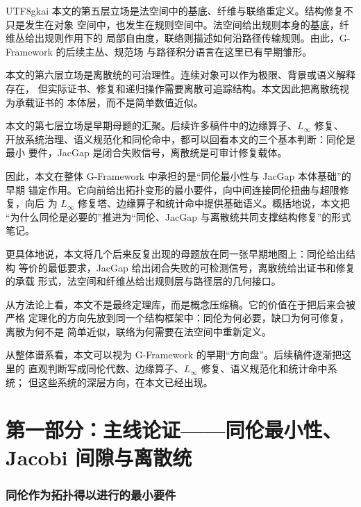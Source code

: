 \documentclass[12pt]{article}
\begin{document}
\begin{CJK*}{UTF8}{gkai}
本文的第五层立场是法空间中的基底、纤维与联络重定义。结构修复不只是发生在对象
空间中，也发生在规则空间中。法空间给出规则本身的基底，纤维丛给出规则作用下的
局部自由度，联络则描述如何沿路径传输规则。由此，G-Framework 的后续主丛、规范场
与路径积分语言在这里已有早期雏形。

本文的第六层立场是离散统的可治理性。连续对象可以作为极限、背景或语义解释存在，
但实际证书、修复和递归操作需要离散可追踪结构。本文因此把离散统视为承载证书的
本体层，而不是简单数值近似。

本文的第七层立场是早期母题的汇聚。后续许多稿件中的边缘算子、\(L_\infty\) 修复、
开放系统治理、语义规范化和同伦命中，都可以回看本文的三个基本判断：同伦是最小
要件，JacGap 是闭合失败信号，离散统是可审计修复载体。

因此，本文在整体 G-Framework 中承担的是“同伦最小性与 JacGap 本体基础”的早期
锚定作用。它向前给出拓扑变形的最小要件，向中间连接同伦扭曲与超限修复，向后
为 \(L_\infty\) 修复塔、边缘算子和统计命中提供基础语义。概括地说，本文把
“为什么同伦是必要的”推进为“同伦、JacGap 与离散统共同支撑结构修复”的形式笔记。

更具体地说，本文将几个后来反复出现的母题放在同一张早期地图上：同伦给出结构
等价的最低要求，JacGap 给出闭合失败的可检测信号，离散统给出证书和修复的承载
形式，法空间和纤维丛给出规则层与路径层的几何接口。

从方法论上看，本文不是最终定理库，而是概念压缩稿。它的价值在于把后来会被严格
定理化的方向先放到同一个结构框架中：同伦为何必要，缺口为何可修复，离散为何不是
简单近似，联络为何需要在法空间中重新定义。

从整体谱系看，本文可以视为 G-Framework 的早期“方向盘”。后续稿件逐渐把这里的
直观判断写成同伦代数、边缘算子、\(L_\infty\) 修复、语义规范化和统计命中系统；
但这些系统的深层方向，在本文已经出现。

\tableofcontents
\clearpage

\setcounter{part}{1}
\part*{第一部分：主线论证——同伦最小性、Jacobi 间隙与离散统}

\section{同伦作为拓扑得以进行的最小要件}


\end{CJK*}
\end{document}
